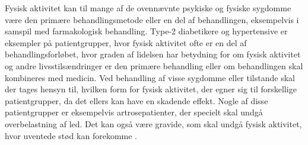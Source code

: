 Fysisk aktivitet kan til mange af de ovennævnte psykiske og fysiske sygdomme være den primære behandlingsmetode eller en del af behandlingen, eksempelvis i samspil med farmakologisk behandling. Type-2 diabetikere og hypertensive er eksempler på patientgrupper, hvor fysisk aktivitet ofte er en del af behandlingsforløbet, hvor graden af lidelsen har betydning for om fysisk aktivitet og andre livsstilsændringer er den primære behandling eller om behandlingen skal kombineres med medicin. Ved behandling af visse sygdomme eller tilstande skal der tages hensyn til, hvilken form for fysisk aktivitet, der egner sig til forskellige patientgrupper, da det ellers kan have en skadende effekt. Nogle af disse patientgrupper er eksempelvis artrosepatienter, der specielt skal undgå overbelastning af led. Det kan også være gravide, som skal undgå fysisk aktivitet, hvor uventede stød kan forekomme \citep{pedersen2011,andersen2001}.
